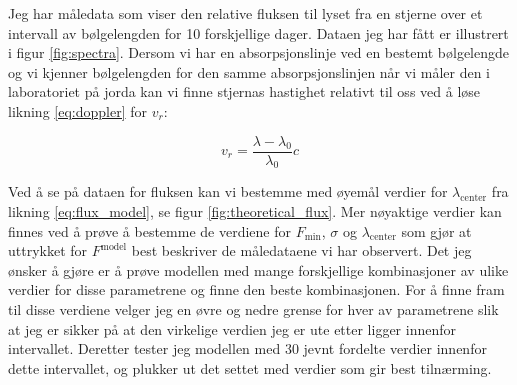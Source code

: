 \documentclass[reprint, english,notitlepage]{revtex4-1}  %
\begin{document}
Jeg har måledata som viser den
 relative fluksen til lyset fra en stjerne over et intervall av bølgelengden for 10 forskjellige dager. Dataen jeg har fått er illustrert i figur \ref{fig:spectra}. Dersom vi har en absorpsjonslinje
 ved en bestemt bølgelengde og vi kjenner bølgelengden for den samme absorpsjonslinjen når vi måler
 den i laboratoriet på jorda kan vi finne stjernas hastighet relativt til oss ved å løse likning
 \ref{eq:doppler} for $v_r$:

\begin{equation}
  \label{eq:v_r}
  v_r = \frac{\lambda - \lambda_0}{\lambda_0} c
\end{equation}

Ved å se på dataen for fluksen kan vi bestemme med øyemål verdier for $\lambda_{\text{center}}$ fra
 likning \ref{eq:flux_model}, se figur \ref{fig:theoretical_flux}. Mer nøyaktige verdier kan
 finnes ved å prøve å bestemme de verdiene for $F_{\text{min}}$, $\sigma$ og $\lambda_{\text{center}}$ som gjør
 at uttrykket for $F^{\text{model}}$ best beskriver de måledataene vi har observert. Det jeg ønsker å
 gjøre er å prøve modellen med mange forskjellige kombinasjoner av ulike verdier for disse
 parametrene og finne den beste kombinasjonen. For å finne fram til disse verdiene velger jeg en
 øvre og nedre grense for hver av parametrene slik at jeg er sikker på at den virkelige verdien
 jeg er ute etter ligger innenfor intervallet. Deretter tester jeg modellen med 30 jevnt fordelte
 verdier innenfor dette intervallet, og plukker ut det settet med verdier som gir best tilnærming.
\end{document}
